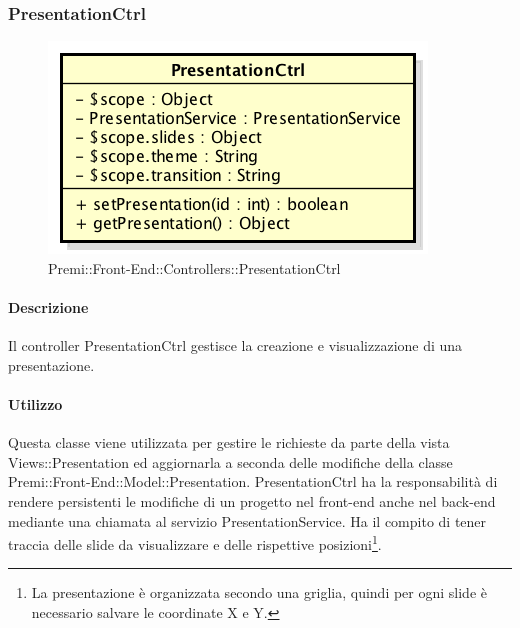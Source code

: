 \newpage
\subsubsection{PresentationCtrl}
\begin{figure}[h]
	\centering
	\includegraphics[width=0.4\linewidth]{img/premi_front_end_controllers_presentationctrl}
	\caption[Premi::Front-End::Controllers::PresentationCtrl]{Premi::Front-End::Controllers::PresentationCtrl}
\end{figure}
	\paragraph{Descrizione}
	Il controller PresentationCtrl gestisce la creazione e visualizzazione di una presentazione.

	\paragraph{Utilizzo}
	Questa classe viene utilizzata per gestire le richieste da parte della vista Views::Presentation ed aggiornarla a seconda delle modifiche della classe Premi::Front-End::Model::Presentation. PresentationCtrl ha la responsabilità di rendere persistenti le modifiche di un progetto nel front-end anche nel back-end mediante una chiamata al servizio PresentationService.
	Ha il compito di tener traccia delle slide da visualizzare e delle rispettive posizioni\footnote{La presentazione è organizzata secondo una griglia, quindi per ogni slide è necessario salvare le coordinate X e Y.}.
